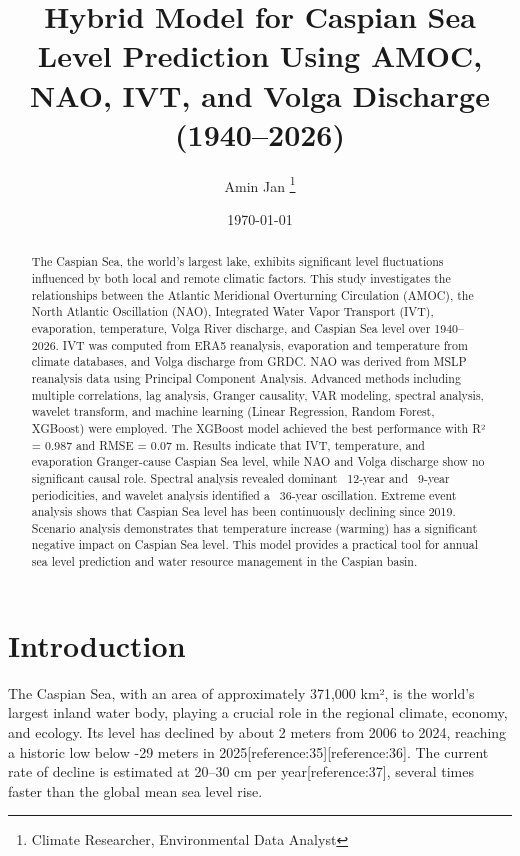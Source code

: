 \documentclass[12pt,letterpaper]{article}
\title{Hybrid Model for Caspian Sea Level Prediction Using AMOC, NAO, IVT, and Volga Discharge (1940–2026)}
\author{Amin Jan \thanks{Climate Researcher, Environmental Data Analyst}}
\date{\today}
\begin{document}
\maketitle

\begin{abstract}
The Caspian Sea, the world's largest lake, exhibits significant level fluctuations influenced by both local and remote climatic factors. This study investigates the relationships between the Atlantic Meridional Overturning Circulation (AMOC), the North Atlantic Oscillation (NAO), Integrated Water Vapor Transport (IVT), evaporation, temperature, Volga River discharge, and Caspian Sea level over 1940–2026. IVT was computed from ERA5 reanalysis, evaporation and temperature from climate databases, and Volga discharge from GRDC. NAO was derived from MSLP reanalysis data using Principal Component Analysis. Advanced methods including multiple correlations, lag analysis, Granger causality, VAR modeling, spectral analysis, wavelet transform, and machine learning (Linear Regression, Random Forest, XGBoost) were employed. The XGBoost model achieved the best performance with R² = 0.987 and RMSE = 0.07 m. Results indicate that IVT, temperature, and evaporation Granger-cause Caspian Sea level, while NAO and Volga discharge show no significant causal role. Spectral analysis revealed dominant ~12-year and ~9-year periodicities, and wavelet analysis identified a ~36-year oscillation. Extreme event analysis shows that Caspian Sea level has been continuously declining since 2019. Scenario analysis demonstrates that temperature increase (warming) has a significant negative impact on Caspian Sea level. This model provides a practical tool for annual sea level prediction and water resource management in the Caspian basin.
\end{abstract}

\section{Introduction}

The Caspian Sea, with an area of approximately 371,000 km², is the world's largest inland water body, playing a crucial role in the regional climate, economy, and ecology. Its level has declined by about 2 meters from 2006 to 2024, reaching a historic low below -29 meters in 2025[reference:35][reference:36]. The current rate of decline is estimated at 20–30 cm per year[reference:37], several times faster than the global mean sea level rise.
\end{document}
